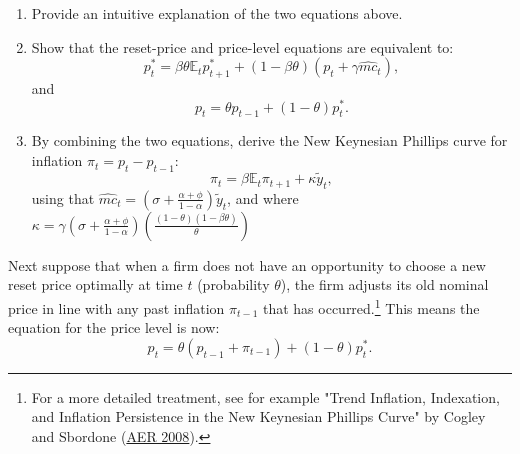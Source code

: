 \documentclass[dvipsnames,11pt]{article}
\begin{document}
    \begin{enumerate}
    
        \item Provide an intuitive explanation of the two equations above.
    
            \begin{solution}
    
                
                
            \end{solution}
    
        \item Show that the reset-price and price-level equations are equivalent to:
        \[
        p^*_t = \beta \theta \mathbb{E}_t p^*_{t+1} + (1 - \beta \theta)(p_t +  \gamma \widehat{mc}_{t}),
        \]
        and
        \[
        p_t = \theta p_{t-1} + (1 - \theta) p^*_t.
        \]
    
            \begin{solution}
    
                
                
            \end{solution}
    
        \item By combining the two equations, derive the New Keynesian Phillips curve for inflation $\pi_t = p_t - p_{t-1}$:
        \[
        \pi_t = \beta \mathbb{E}_t \pi_{t+1} + \kappa \widetilde{y}_t,
        \]
        using that $\widehat{mc}_t = \left( \sigma + \frac{\alpha + \phi}{1 - \alpha}  \right) \widetilde{y}_t$, and where $\kappa = \gamma \left( \sigma + \frac{\alpha + \phi}{1 - \alpha}  \right) \left( \frac{(1 - \theta)(1 - \beta \theta)}{\theta}    \right)$
    
            \begin{solution}
    
                
                
            \end{solution}
            
    \end{enumerate}

    \noindent Next suppose that when a firm does not have an opportunity to choose a new reset price optimally at time $t$ (probability $\theta$), the firm adjusts its old nominal price in line with any past inflation $\pi_{t-1}$ that has occurred.\footnote{For a more detailed treatment, see for example "Trend Inflation, Indexation, and Inflation Persistence in the New Keynesian Phillips Curve" by Cogley and Sbordone (\href{https://www.aeaweb.org/articles?id=10.1257/aer.98.5.2101}{AER 2008}).} This means the equation for the price level is now:
    \[
    p_t = \theta (p_{t-1} + \pi_{t-1}) + (1 - \theta) p^*_t.
    \]
    
\end{document}
